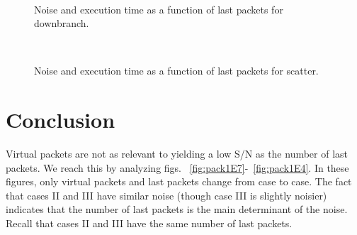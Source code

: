 \documentclass[letterpaper,12pt]{article}
\begin{document}
\begin{figure}[ht!]
  \begin{center}
    \\ 
  \end{center}
  \caption{Noise and execution time as a function of last packets for downbranch.
  }
  \label{fig:noise_last_packets_downbranch}
\end{figure}

\begin{figure}[ht!]
  \begin{center}
    \\ 
  \end{center}
  \caption{Noise and execution time as a function of last packets for scatter.
  }
  \label{fig:noise_last_packets_scatter}
\end{figure}


\section{Conclusion}

Virtual packets are not as relevant to yielding a low S/N as the number of last packets. We reach this by analyzing figs. ~\ref{fig:pack1E7}-~\ref{fig:pack1E4}. In these figures, only virtual packets and last packets change from case to case. The fact that cases II and III have similar noise (though case III is slightly noisier) indicates that the number of last packets is the main determinant of the noise. Recall that cases II and III have the same number of last packets. 
\end{document}
